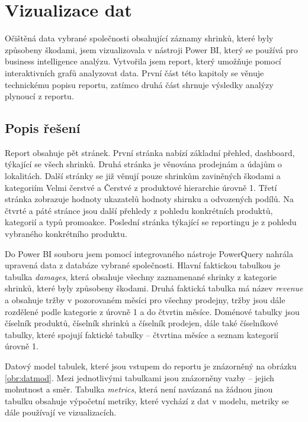 \chapter{Vizualizace dat}
\label{ch:vizualizace}

Očištěná data vybrané společnosti obsahující záznamy shrinků, které byly způsobeny škodami, jsem vizualizovala v nástroji Power BI, který se používá pro business intelligence analýzu. Vytvořila jsem report, který umožňuje pomocí interaktivních grafů analyzovat data. První část této kapitoly se věnuje technickému popisu reportu, zatímco druhá část shrnuje výsledky analýzy plynoucí z reportu.

\section{Popis řešení}
\label{sec:vizualizace:popis}

Report obsahuje pět stránek. První stránka nabízí základní přehled, dashboard, týkající se všech shrinků. Druhá stránka je věnována prodejnám a údajům o lokalitách.
Další stránky se již věnují pouze shrinkům zaviněných škodami a kategoriím Velmi čerstvé a Čerstvé z produktové hierarchie úrovně 1. Třetí stránka zobrazuje hodnoty ukazatelů hodnoty shirnku a odvozených podílů. Na čtvrté a páté stránce jsou další přehledy z pohledu konkrétních produktů, kategorií a typů promoakce. Poslední stránka týkající se reportingu je z pohledu vybraného konkrétního produktu.

Do Power BI souboru jsem pomocí integrovaného nástroje PowerQuery nahrála upravená data z databáze vybrané společnosti. Hlavní faktickou tabulkou je tabulka \emph{damages}, která obsahuje všechny zaznamenané shrinky z kategorie shrinků, které byly způsobeny škodami. Druhá faktická tabulka má název \emph{revenue} a obsahuje tržby v pozorovaném měsíci pro všechny prodejny, tržby jsou dále rozdělené podle kategorie z úrovně 1 a do čtvrtin měsíce. Doménové tabulky jsou číselník produktů, číselník shrinků a číselník prodejen, dále také číselníkové tabulky, které spojují faktické tabulky -- čtvrtina měsíce a seznam kategorií úrovně 1. 

Datový model tabulek, které jsou vstupem do reportu je znázorněný na obrázku \ref{obr:datmod}. Mezi jednotlivými tabulkami jsou znázorněny vazby -- jejich mohutnost a směr. Tabulka \emph{metrics}, která není navázaná na žádnou jinou tabulku obsahuje výpočetní metriky, které vychází z dat v modelu, metriky se dále používají ve vizualizacích.

